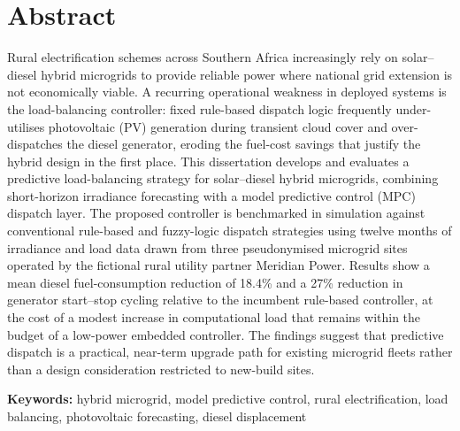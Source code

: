 \chapter*{Abstract}
Rural electrification schemes across Southern Africa increasingly rely on solar--diesel hybrid
microgrids to provide reliable power where national grid extension is not economically viable.
A recurring operational weakness in deployed systems is the load-balancing controller: fixed
rule-based dispatch logic frequently under-utilises photovoltaic (PV) generation during
transient cloud cover and over-dispatches the diesel generator, eroding the fuel-cost savings
that justify the hybrid design in the first place. This dissertation develops and evaluates a
predictive load-balancing strategy for solar--diesel hybrid microgrids, combining short-horizon
irradiance forecasting with a model predictive control (MPC) dispatch layer. The proposed
controller is benchmarked in simulation against conventional rule-based and fuzzy-logic
dispatch strategies using twelve months of irradiance and load data drawn from three
pseudonymised microgrid sites operated by the fictional rural utility partner Meridian Power.
Results show a mean diesel fuel-consumption reduction of 18.4\% and a 27\% reduction in
generator start--stop cycling relative to the incumbent rule-based controller, at the cost of a
modest increase in computational load that remains within the budget of a low-power embedded
controller. The findings suggest that predictive dispatch is a practical, near-term upgrade
path for existing microgrid fleets rather than a design consideration restricted to new-build
sites.

\vspace{0.6cm}
\noindent\textbf{Keywords:} hybrid microgrid, model predictive control, rural electrification,
load balancing, photovoltaic forecasting, diesel displacement

